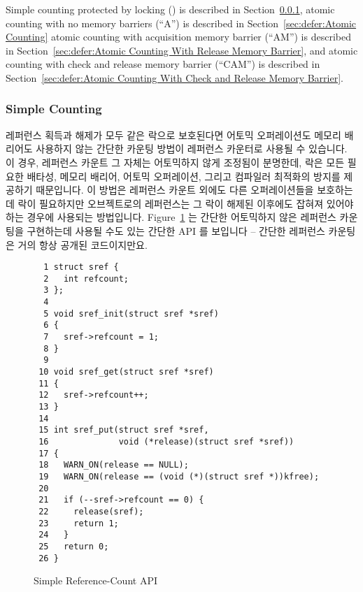 Simple counting protected by locking () is described in
Section~\ref{sec:defer:Simple Counting},
atomic counting with no memory barriers (``A'') is described in
Section~\ref{sec:defer:Atomic Counting}
atomic counting with acquisition memory barrier (``AM'') is described in
Section~\ref{sec:defer:Atomic Counting With Release Memory Barrier},
and
atomic counting with check and release memory barrier (``CAM'') is described in
Section~\ref{sec:defer:Atomic Counting With Check and Release Memory Barrier}.
\fi

\subsubsection{Simple Counting}
\label{sec:defer:Simple Counting}

레퍼런스 획득과 해제가 모두 같은 락으로 보호된다면 어토믹 오퍼레이션도 메모리
배리어도 사용하지 않는 간단한 카운팅 방법이 레퍼런스 카운터로 사용될 수
있습니다.
이 경우, 레퍼런스 카운트 그 자체는 어토믹하지 않게 조정됨이 분명한데, 락은 모든
필요한 배타성, 메모리 배리어, 어토믹 오퍼레이션, 그리고 컴파일러 최적화의
방지를 제공하기 때문입니다.
이 방법은 레퍼런스 카운트 외에도 다른 오퍼레이션들을 보호하는데 락이 필요하지만
오브젝트로의 레퍼런스는 그 락이 해제된 이후에도 잡혀져 있어야 하는 경우에
사용되는 방법입니다.
Figure~\ref{fig:defer:Simple Reference-Count API} 는 간단한 어토믹하지 않은
레퍼런스 카운팅을 구현하는데 사용될 수도 있는 간단한 API 를 보입니다 -- 간단한
레퍼런스 카운팅은 거의 항상 공개된 코드이지만요.
\iffalse

Simple counting, with neither atomic operations nor memory barriers,
can be used when the reference-counter acquisition and release are
both protected by the same lock.
In this case, it should be clear that the reference count itself
may be manipulated non-atomically, because the lock provides any
necessary exclusion, memory barriers, atomic instructions, and disabling
of compiler optimizations.
This is the method of choice when the lock is required to protect
other operations in addition to the reference count, but where
a reference to the object must be held after the lock is released.
Figure~\ref{fig:defer:Simple Reference-Count API} shows a simple
API that might be used to implement simple non-atomic reference
counting -- although simple reference counting is almost always
open-coded instead.
\fi

\begin{figure}[htbp]
{ \scriptsize
\begin{verbatim}
  1 struct sref {
  2   int refcount;
  3 };
  4
  5 void sref_init(struct sref *sref)
  6 {
  7   sref->refcount = 1;
  8 }
  9
 10 void sref_get(struct sref *sref)
 11 {
 12   sref->refcount++;
 13 }
 14
 15 int sref_put(struct sref *sref,
 16              void (*release)(struct sref *sref))
 17 {
 18   WARN_ON(release == NULL);
 19   WARN_ON(release == (void (*)(struct sref *))kfree);
 20
 21   if (--sref->refcount == 0) {
 22     release(sref);
 23     return 1;
 24   }
 25   return 0;
 26 }
\end{verbatim}
}
\caption{Simple Reference-Count API}
\label{fig:defer:Simple Reference-Count API}
\end{figure}

